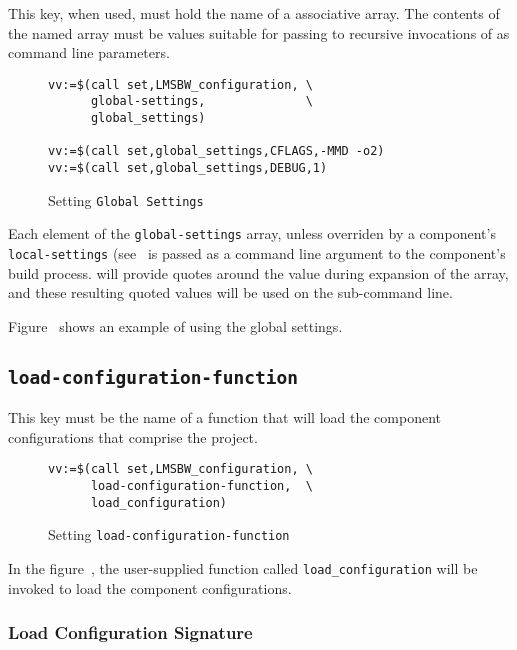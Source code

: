 This key, when used, must hold the name of a \gmsl associative array.
The contents of the named array must be values suitable for passing to
recursive invocations of \make as command line parameters.

\begin{figure}
\hrulefill
\begin{verbatim}
vv:=$(call set,LMSBW_configuration, \
      global-settings,              \
      global_settings)

vv:=$(call set,global_settings,CFLAGS,-MMD -o2)
vv:=$(call set,global_settings,DEBUG,1)
\end{verbatim}
\hrulefill
\caption{Setting \texttt{Global Settings}}\label{variables:global-settings-example}
\end{figure}

Each element of the \texttt{global-settings} array, unless overriden
by a component's \texttt{local-settings}
(see~\xref{variables:local-settings} is passed as a command line
argument to the component's build process.  \lmsbw will provide quotes
around the value during expansion of the array, and these resulting
quoted values will be used on the sub-\make command line.

Figure~ shows an example of
using the global settings.

\subsection{\texttt{load-configuration-function}}\label{variables:load-configuration-function}

This key must be the name of a \gnumake function that will load the
component configurations that comprise the project.

\begin{figure}
\hrulefill
\begin{verbatim}
vv:=$(call set,LMSBW_configuration, \
      load-configuration-function,  \
      load_configuration)
\end{verbatim}
\hrulefill
\caption{Setting \texttt{load-configuration-function}}\label{variables:set-load-configuration}
\end{figure}

In the figure~, the
user-supplied function called \texttt{load\_configuration} will be
invoked to load the component configurations.

\subsubsection{Load Configuration Signature}

